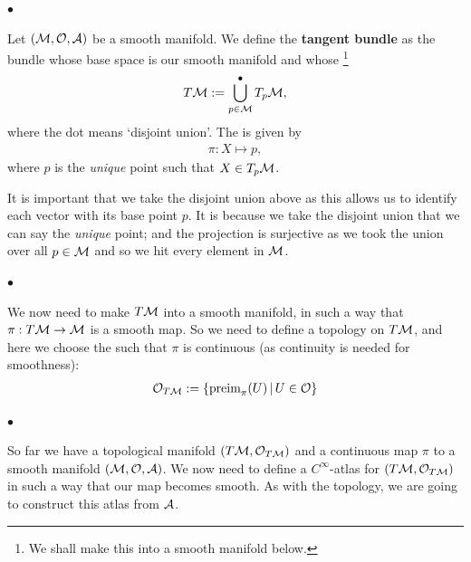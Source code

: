 \documentclass[12pt]{article} %
\begin{document}
$\bullet$ 

Let $(\mathcal{M},\mathcal{O},\mathcal{A})$ be a smooth manifold. We define the \textbf{tangent bundle} as the bundle whose base space is our smooth manifold and whose  \footnote{We shall make this into a smooth manifold below.} 
\begin{align*}
    T\mathcal{M} := \bigcup^{\bullet}_{p\in\mathcal{M}} T_p\mathcal{M},
\end{align*}
where the dot means `disjoint union'. The  is given by
\begin{align*}
    \pi : X \mapsto p,
\end{align*}
where $p$ is the \textit{unique} point such that $X\in T_p\mathcal{M}$.

It is important that we take the disjoint union above as this allows us to identify each vector with its base point $p$. It is because we take the disjoint union that we can say the \textit{unique} point; and the projection is surjective as we took the union over all $p\in\mathcal{M}$ and so we hit every element in $\mathcal{M}$. 

$\bullet$ 

We now need to make $T\mathcal{M}$ into a smooth manifold, in such a way that $\pi:T\mathcal{M} \to \mathcal{M}$ is a smooth map. So we need to define a topology on $T\mathcal{M}$, and here we choose the  such that $\pi$ is continuous (as continuity is needed for smoothness):
\begin{align*}
    \mathcal{O}_{T\mathcal{M}} := \{ \text{preim}_{\pi}(U) \, | \, U\in\mathcal{O}\}
\end{align*}

$\bullet$ 

So far we have a topological manifold $(T\mathcal{M},\mathcal{O}_{T\mathcal{M}})$ and a continuous map $\pi$ to a smooth manifold $(\mathcal{M},\mathcal{O},\mathcal{A})$. We now need to define a $C^{\infty}$-atlas for $(T\mathcal{M},\mathcal{O}_{T\mathcal{M}})$ in such a way that our map becomes smooth. As with the topology, we are going to construct this atlas from $\mathcal{A}$. 
\end{document}
